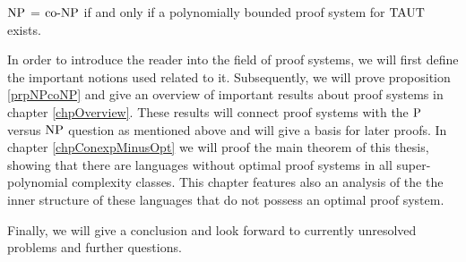   \begin{proposition} \label{prpNPcoNP}
    \(\NP\) = \(\coNP\) if and only if a polynomially bounded proof system for \(\TAUT\) exists.
  \end{proposition}

  In order to introduce the reader into the field of proof systems, we will first define the important notions used related to it. Subsequently, we will prove proposition \ref{prpNPcoNP} and give an overview of important results about proof systems in chapter \ref{chpOverview}. These results will connect proof systems with the \(\P\) versus \(\NP\) question as mentioned above and will give a basis for later proofs.
  In chapter \ref{chpConexpMinusOpt} we will proof the main theorem of this thesis, showing that there are languages without optimal proof systems in all super-polynomial complexity classes. This chapter features also an analysis of the the inner structure of these languages that do not possess an optimal proof system.

  Finally, we will give a conclusion and look forward to currently unresolved problems and further questions.

